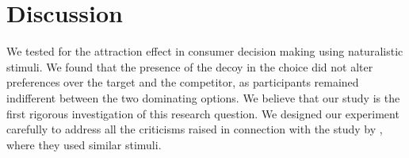 \documentclass[12pt, a4paper]{article}
\begin{document}
\begin{table}[!htbp] \centering
\captionsetup{justification=centering}
  \caption{Odds-ratios and 95\% CIs from a mixed-effects logistic model with subject-specific intercepts. (T - Target, C - Competitor, D - Decoy)}
  \label{latentattr_exp2reg}
\end{table}

\section{Discussion}

We tested for the attraction effect in consumer decision making using naturalistic stimuli. We found that the presence of the decoy in the choice did not alter preferences over the target and the competitor, as participants remained indifferent between the two dominating options. We believe that our study is the first rigorous investigation of this research question. We designed our experiment carefully to address all the criticisms raised in connection with the study by \citeauthor{Frederick2014}, where they used similar stimuli.
\end{document}
